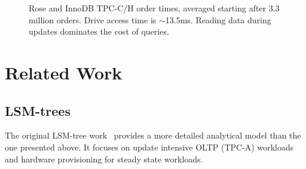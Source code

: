 \documentclass{vldb}
\newcommand{\rows}{Rose\xspace}
\newcommand{\rowss}{Rose's\xspace}
\begin{document}


\begin{figure}
\centering {}
\caption{\rows and InnoDB TPC-C/H order times, averaged starting after
  3.3 million orders.  Drive access time is $\sim$13.5ms.  Reading
  data during updates dominates the cost of queries.}
\label{fig:tpch-innodb}
\end{figure}




\section{Related Work}

\subsection{LSM-trees}

The original LSM-tree work~\cite{lsm} provides a more detailed
analytical model than the one presented above.  It focuses on update
intensive OLTP (TPC-A) workloads and hardware provisioning for steady
state workloads.
\end{document}
